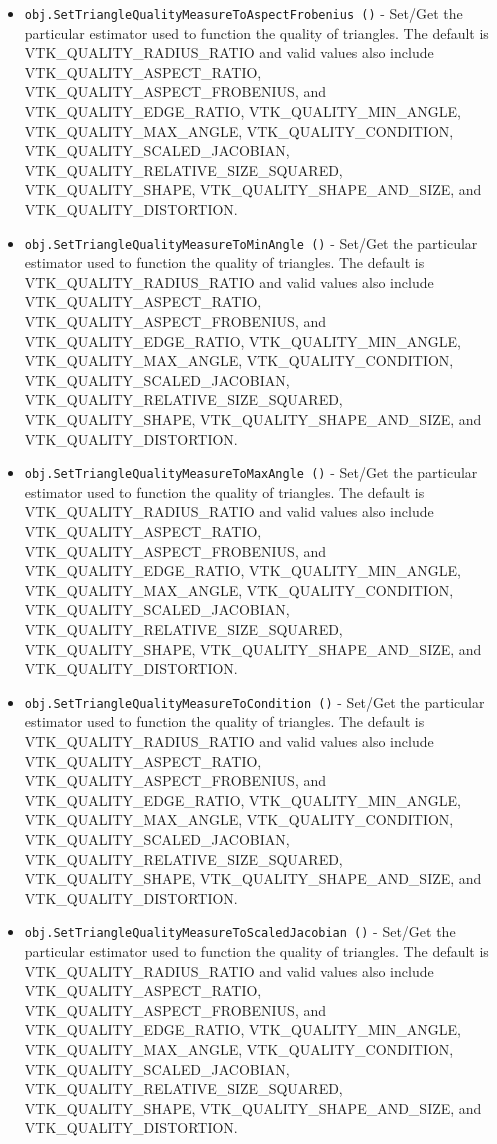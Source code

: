 \begin{itemize}
\item  \verb|obj.SetTriangleQualityMeasureToAspectFrobenius ()| -  Set/Get the particular estimator used to function the quality of triangles.
 The default is VTK\_QUALITY\_RADIUS\_RATIO and valid values also include
 VTK\_QUALITY\_ASPECT\_RATIO, VTK\_QUALITY\_ASPECT\_FROBENIUS, and VTK\_QUALITY\_EDGE\_RATIO,
 VTK\_QUALITY\_MIN\_ANGLE, VTK\_QUALITY\_MAX\_ANGLE, VTK\_QUALITY\_CONDITION,
 VTK\_QUALITY\_SCALED\_JACOBIAN, VTK\_QUALITY\_RELATIVE\_SIZE\_SQUARED,
 VTK\_QUALITY\_SHAPE, VTK\_QUALITY\_SHAPE\_AND\_SIZE, and VTK\_QUALITY\_DISTORTION.

\item  \verb|obj.SetTriangleQualityMeasureToMinAngle ()| -  Set/Get the particular estimator used to function the quality of triangles.
 The default is VTK\_QUALITY\_RADIUS\_RATIO and valid values also include
 VTK\_QUALITY\_ASPECT\_RATIO, VTK\_QUALITY\_ASPECT\_FROBENIUS, and VTK\_QUALITY\_EDGE\_RATIO,
 VTK\_QUALITY\_MIN\_ANGLE, VTK\_QUALITY\_MAX\_ANGLE, VTK\_QUALITY\_CONDITION,
 VTK\_QUALITY\_SCALED\_JACOBIAN, VTK\_QUALITY\_RELATIVE\_SIZE\_SQUARED,
 VTK\_QUALITY\_SHAPE, VTK\_QUALITY\_SHAPE\_AND\_SIZE, and VTK\_QUALITY\_DISTORTION.

\item  \verb|obj.SetTriangleQualityMeasureToMaxAngle ()| -  Set/Get the particular estimator used to function the quality of triangles.
 The default is VTK\_QUALITY\_RADIUS\_RATIO and valid values also include
 VTK\_QUALITY\_ASPECT\_RATIO, VTK\_QUALITY\_ASPECT\_FROBENIUS, and VTK\_QUALITY\_EDGE\_RATIO,
 VTK\_QUALITY\_MIN\_ANGLE, VTK\_QUALITY\_MAX\_ANGLE, VTK\_QUALITY\_CONDITION,
 VTK\_QUALITY\_SCALED\_JACOBIAN, VTK\_QUALITY\_RELATIVE\_SIZE\_SQUARED,
 VTK\_QUALITY\_SHAPE, VTK\_QUALITY\_SHAPE\_AND\_SIZE, and VTK\_QUALITY\_DISTORTION.

\item  \verb|obj.SetTriangleQualityMeasureToCondition ()| -  Set/Get the particular estimator used to function the quality of triangles.
 The default is VTK\_QUALITY\_RADIUS\_RATIO and valid values also include
 VTK\_QUALITY\_ASPECT\_RATIO, VTK\_QUALITY\_ASPECT\_FROBENIUS, and VTK\_QUALITY\_EDGE\_RATIO,
 VTK\_QUALITY\_MIN\_ANGLE, VTK\_QUALITY\_MAX\_ANGLE, VTK\_QUALITY\_CONDITION,
 VTK\_QUALITY\_SCALED\_JACOBIAN, VTK\_QUALITY\_RELATIVE\_SIZE\_SQUARED,
 VTK\_QUALITY\_SHAPE, VTK\_QUALITY\_SHAPE\_AND\_SIZE, and VTK\_QUALITY\_DISTORTION.

\item  \verb|obj.SetTriangleQualityMeasureToScaledJacobian ()| -  Set/Get the particular estimator used to function the quality of triangles.
 The default is VTK\_QUALITY\_RADIUS\_RATIO and valid values also include
 VTK\_QUALITY\_ASPECT\_RATIO, VTK\_QUALITY\_ASPECT\_FROBENIUS, and VTK\_QUALITY\_EDGE\_RATIO,
 VTK\_QUALITY\_MIN\_ANGLE, VTK\_QUALITY\_MAX\_ANGLE, VTK\_QUALITY\_CONDITION,
 VTK\_QUALITY\_SCALED\_JACOBIAN, VTK\_QUALITY\_RELATIVE\_SIZE\_SQUARED,
 VTK\_QUALITY\_SHAPE, VTK\_QUALITY\_SHAPE\_AND\_SIZE, and VTK\_QUALITY\_DISTORTION.


\end{itemize}
